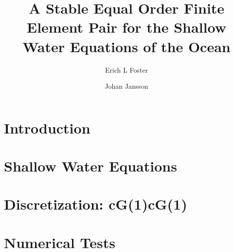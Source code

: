 \documentclass{elsarticle}
\begin{document}
  \begin{frontmatter}
    \author[1]{Erich L Foster}

    \author[1]{Johan Jansson}

    \address[1]{Basque Center for Applied Mathematics, Alameda Mazarredo, 14,
      48009 Bilbao, Basque Country -- Spain}

    \title{A Stable Equal Order Finite Element Pair for the Shallow Water
    Equations of the Ocean}

    \begin{abstract}
    \end{abstract}
  \end{frontmatter}

  \section{Introduction} \label{sec:Intro}
  

  \section{Shallow Water Equations} \label{sec:SWE}
  

  \section{Discretization: cG(1)cG(1)} \label{sec:Discrete}
  

  \section{Numerical Tests} \label{sec:Tests}
  

  
  
\end{document}
